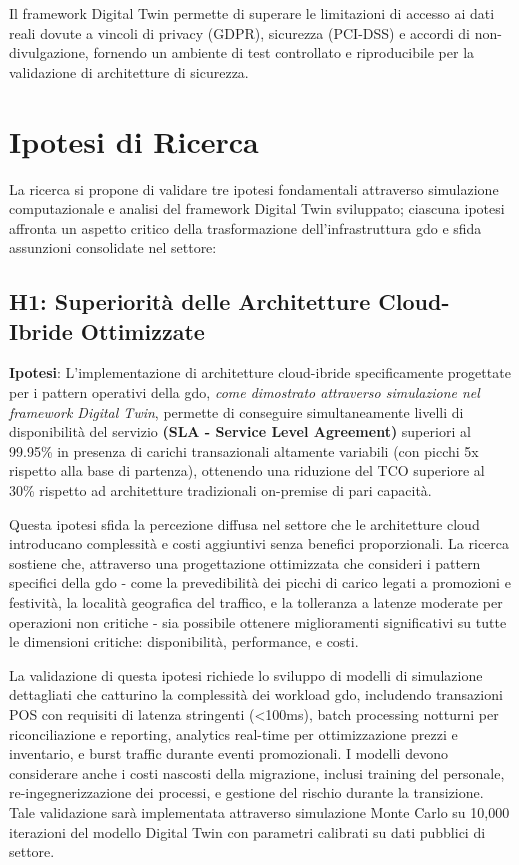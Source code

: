 Il framework Digital Twin permette di superare le limitazioni di accesso ai dati reali dovute a vincoli di privacy (GDPR), sicurezza (PCI-DSS) e accordi di non-divulgazione, fornendo un ambiente di test controllato e riproducibile per la validazione di architetture di sicurezza.

\section{Ipotesi di Ricerca}
\label{sec:ipotesi_ricerca}

La ricerca si propone di validare tre ipotesi fondamentali attraverso 
simulazione computazionale e analisi del framework Digital Twin sviluppato; ciascuna ipotesi affronta un aspetto critico della trasformazione dell'infrastruttura \gls{gdo} e sfida assunzioni consolidate nel settore:

\subsection{H1: Superiorità delle Architetture Cloud-Ibride Ottimizzate}

\label{ssec:h1}
\textbf{Ipotesi}: L'implementazione di architetture cloud-ibride specificamente progettate per i pattern operativi della \gls{gdo}, \textit{come dimostrato attraverso 
simulazione nel framework Digital Twin}, permette di conseguire simultaneamente livelli di disponibilità del servizio \textbf{(SLA - Service Level Agreement)} superiori al 99.95\% in presenza di carichi transazionali altamente variabili (con picchi 5x rispetto alla base di partenza), ottenendo una riduzione del TCO superiore al 30\% rispetto ad architetture tradizionali on-premise di pari capacità.

Questa ipotesi sfida la percezione diffusa nel settore che le architetture cloud introducano complessità e costi aggiuntivi senza benefici proporzionali. La ricerca sostiene che, attraverso una progettazione ottimizzata che consideri i pattern specifici della \gls{gdo} - come la prevedibilità dei picchi di carico legati a promozioni e festività, la località geografica del traffico, e la tolleranza a latenze moderate per operazioni non critiche - sia possibile ottenere miglioramenti significativi su tutte le dimensioni critiche: disponibilità, performance, e costi.

La validazione di questa ipotesi richiede lo sviluppo di modelli di simulazione dettagliati che catturino la complessità dei workload \gls{gdo}, includendo transazioni POS con requisiti di latenza stringenti (<100ms), batch processing notturni per riconciliazione e reporting, analytics real-time per ottimizzazione prezzi e inventario, e burst traffic durante eventi promozionali. I modelli devono considerare anche i costi nascosti della migrazione, inclusi training del personale, re-ingegnerizzazione dei processi, e gestione del rischio durante la transizione. Tale validazione sarà implementata attraverso simulazione Monte Carlo su 10,000 iterazioni del modello Digital Twin con parametri calibrati su dati pubblici di settore.


